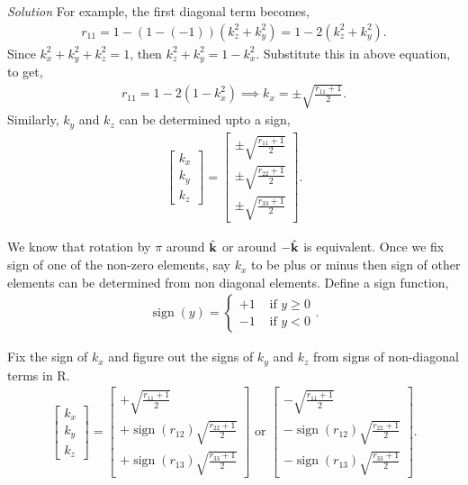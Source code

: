 \documentclass{article}
\DeclareMathOperator{\sign}{sign}
\numberwithin{prob}{section}
\newenvironment{solution}{\emph{Solution}}{}
\begin{document}
\begin{solution}
For example, the first diagonal term becomes,
\begin{align}
  r_{11} = 1 - (1-(-1))(k_z^2 + k_y^2) = 1-2(k_z^2 + k_y^2).
\end{align}
Since $k_x^2 + k_y^2 + k_z^2 = 1$, then $k_z^2 + k_y^2 =  1- k_x^2$. Substitute this in above equation, to get,
\begin{align}
  r_{11} =  1-2(1-k_x^2) \implies k_x = \pm \sqrt{\frac{r_{11}+1}{2}}.
\end{align}
Similarly, $k_y$ and $k_z$ can be determined upto a sign,
\begin{align}
  \begin{bmatrix}
    k_x \\ k_y \\ k_z
  \end{bmatrix} 
  = \begin{bmatrix}
\pm \sqrt{\frac{r_{11}+1}{2}}
\\
\pm \sqrt{\frac{r_{22}+1}{2}}
\\
\pm \sqrt{\frac{r_{33}+1}{2}}
  \end{bmatrix}.
\end{align}

We know that rotation by $\pi$ around $\hat{\mathbf{k}}$ or around $-\hat{\mathbf{k}}$ is equivalent. Once we fix sign of one of the non-zero elements, say $k_x$ to be plus or minus then sign of other elements can be determined from non diagonal elements. Define a sign function,
\begin{align}
  \sign(y) = \begin{cases}
    +1 & \text{ if } y \ge 0\\
    -1 & \text{ if } y < 0
  \end{cases}.
\end{align}

Fix the sign of $k_x$ and figure out the signs of $k_y$ and $k_z$ from signs of non-diagonal terms in R.
\begin{align}
  \begin{bmatrix}
    k_x \\ k_y \\ k_z
  \end{bmatrix} 
  = \begin{bmatrix}
+ \sqrt{\frac{r_{11}+1}{2}}
\\
+\sign(r_{12}) \sqrt{\frac{r_{22}+1}{2}}
\\
+\sign(r_{13}) \sqrt{\frac{r_{33}+1}{2}}
\end{bmatrix} \text{ or  }
\begin{bmatrix}
- \sqrt{\frac{r_{11}+1}{2}}
\\
-\sign(r_{12}) \sqrt{\frac{r_{22}+1}{2}}
\\
-\sign(r_{13}) \sqrt{\frac{r_{33}+1}{2}}
\end{bmatrix}.
\end{align}
\end{solution}
\end{document}
